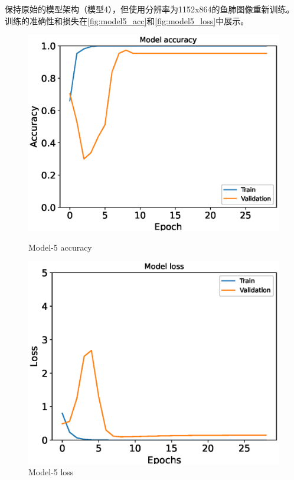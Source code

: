 保持原始的模型架构（模型4），但使用分辨率为1152x864的鱼肺图像重新训练。训练的准确性和损失在\autoref{fig:model5_acc}和\autoref{fig:model5_loss}中展示。
\begin{figure}[H]
    \centering
    \begin{minipage}{0.45\textwidth}
        \centering
        \includegraphics[width=\textwidth]{./fig/fish_lung/accuracy5.eps}
        \caption{Model-5 accuracy}
        \label{fig:model5_acc}
    \end{minipage}
    \begin{minipage}{0.45\textwidth}
        \centering
        \includegraphics[width=\textwidth]{./fig/fish_lung/loss5.eps}
        \caption{Model-5 loss}
        \label{fig:model5_loss}
    \end{minipage}
\end{figure}

